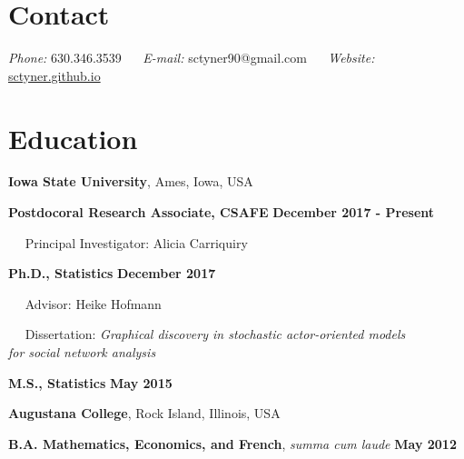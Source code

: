 \documentclass[margin,line]{res}
\newenvironment{list1}{
  \begin{list}{\ding{113}}{%
      \setlength{\itemsep}{0in}
      \setlength{\parsep}{0in} \setlength{\parskip}{0in}
      \setlength{\topsep}{0in} \setlength{\partopsep}{0in} 
      \setlength{\leftmargin}{0.17in}}}{\end{list}}
\begin{document}

\begin{resume}
\section{\sc Contact}
\vspace{.05in}
{{\it Phone:}  630.346.3539 $\quad$ {\it E-mail:} sctyner90@gmail.com $\quad$ {\it Website:} \url{sctyner.github.io} }

\section{\sc Education}
{\bf Iowa State University}, Ames, Iowa, USA\\
\vspace*{-.1in}
\begin{list1}
\item[] {\bf Postdocoral Research Associate, CSAFE} \hfill {\bf December 2017 - Present}
\item[] $\quad$ Principal Investigator: Alicia Carriquiry
\item[] {\bf Ph.D., Statistics}  \hfill {\bf December 2017}
\item[] $\quad$ Advisor: Heike Hofmann
\item[] $\quad$ Dissertation: \textit{Graphical discovery in stochastic actor-oriented models \\  \phantom{AAAAAAAA} for social network analysis}
\item[] {\bf M.S., Statistics}  \hfill {\bf May 2015} 
\end{list1}
\vspace{-.1in}

{\bf Augustana College}, Rock Island, Illinois, USA\\
\vspace*{-.1in}
\begin{list1}
\item[] {\bf B.A. Mathematics, Economics, and French}, \textit{summa cum laude} \hfill {\bf May 2012}
\end{list1}


\end{resume}
\end{document}
